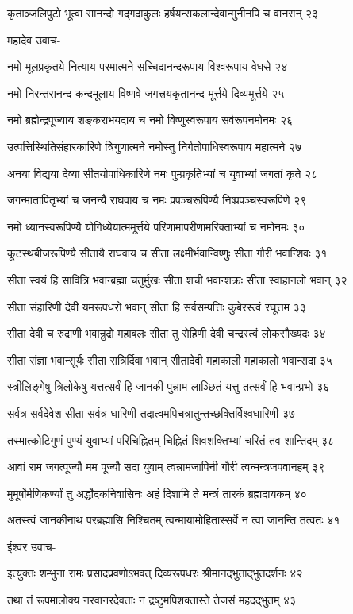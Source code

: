कृताञ्जलिपुटो भूत्वा सानन्दो गद्गदाकुलः
हर्षयन्सकलान्देवान्मुनीनपि च वानरान् २३

महादेव उवाच-

नमो मूलप्रकृतये नित्याय परमात्मने
सच्चिदानन्दरूपाय विश्वरूपाय वेधसे २४

नमो निरन्तरानन्द कन्दमूलाय विष्णवे
जगत्त्रयकृतानन्द मूर्त्तये दिव्यमूर्त्तये २५

नमो ब्रह्मेन्द्रपूज्याय शङ्कराभयदाय च
नमो विष्णुस्वरूपाय सर्वरूपनमोनमः २६

उत्पत्तिस्थितिसंहारकारिणे त्रिगुणात्मने
नमोस्तु निर्गतोपाधिस्वरूपाय महात्मने २७

अनया विद्यया देव्या सीतयोपाधिकारिणे
नमः पुम्प्रकृतिभ्यां च युवाभ्यां जगतां कृते २८

जगन्मातापितृभ्यां च जनन्यै राघवाय च
नमः प्रपञ्चरूपिण्यै निष्प्रपञ्चस्वरूपिणे २९

नमो ध्यानस्वरूपिण्यै योगिध्येयात्ममूर्त्तये
परिणामापरीणामरिक्ताभ्यां च नमोनमः ३०

कूटस्थबीजरूपिण्यै सीतायै राघवाय च
सीता लक्ष्मीर्भवान्विष्णुः सीता गौरी भवान्शिवः ३१

सीता स्वयं हि सावित्रि भवान्ब्रह्मा चतुर्मुखः
सीता शची भवान्शक्रः सीता स्वाहानलो भवान् ३२

सीता संहारिणी देवी यमरूपधरो भवान्
सीता हि सर्वसम्पत्तिः कुबेरस्त्वं रघूत्तम ३३

सीता देवी च रुद्राणी भवान्रुद्रो महाबलः
सीता तु रोहिणी देवी चन्द्रस्त्वं लोकसौख्यदः ३४

सीता संज्ञा भवान्सूर्यः सीता रात्रिर्दिवा भवान्
सीतादेवी महाकाली महाकालो भवान्सदा ३५

स्त्रीलिङ्गेषु त्रिलोकेषु यत्तत्सर्वं हि जानकी
पुन्नाम लाञ्छितं यत्तु तत्सर्वं हि भवान्प्रभो ३६

सर्वत्र सर्वदेवेश सीता सर्वत्र धारिणी
तदात्वमपिचत्रातुन्तच्छक्तिर्विश्वधारिणी ३७

तस्मात्कोटिगुणं पुण्यं युवाभ्यां परिचिह्नितम्
चिह्नितं शिवशक्तिभ्यां चरितं तव शान्तिदम् ३८

आवां राम जगत्पूज्यौ मम पूज्यौ सदा युवाम्
त्वन्नामजापिनी गौरी त्वन्मन्त्रजपवानहम् ३९

मुमूर्षोर्मणिकर्ण्यां तु अर्द्धोदकनिवासिनः
अहं दिशामि ते मन्त्रं तारकं ब्रह्मदायकम् ४०

अतस्त्वं जानकीनाथ परब्रह्मासि निश्चितम्
त्वन्मायामोहितास्सर्वे न त्वां जानन्ति तत्वतः ४१

ईश्वर उवाच-

इत्युक्तः शम्भुना रामः प्रसादप्रवणोऽभवत्
दिव्यरूपधरः श्रीमानद्भुताद्भुतदर्शनः ४२

तथा तं रूपमालोक्य नरवानरदेवताः
न द्रष्टुमपिशक्तास्ते तेजसं महदद्भुतम् ४३

